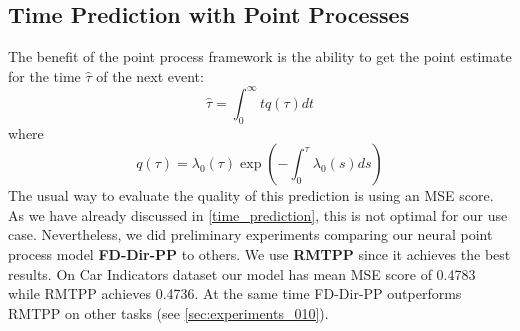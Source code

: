 \subsection{Time Prediction with Point Processes}\label{time_mse}

The benefit of the point process framework is the ability to get the point estimate for the time $\hat{\tau}$ of the next event:
\begin{equation}
    \hat{\tau} = \int_0^\infty t q(\tau) dt
\end{equation}
where
\begin{equation}
q(\tau) = \lambda_0(\tau) \exp\left( -\int_0^{\tau} \lambda_0(s) ds \right)
\end{equation}
The usual way to evaluate the quality of this prediction is using an MSE score. As we have already discussed in \cref{time_prediction}, this is not optimal for our use case. Nevertheless, we did preliminary experiments comparing our neural point process model \textbf{FD-Dir-PP} to others. We use \textbf{RMTPP} \cite{RMTPP} since it achieves the best results. On Car Indicators dataset our model has mean MSE score of 0.4783 while RMTPP achieves 0.4736. At the same time FD-Dir-PP outperforms RMTPP on other tasks (see \cref{sec:experiments_010}).
